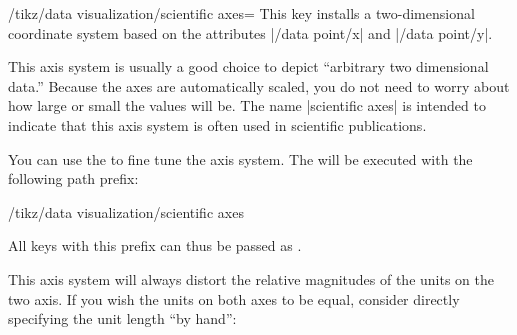 \begin{key}{/tikz/data visualization/scientific axes=}
  This key installs a two-dimensional coordinate system based on the
  attributes |/data point/x| and |/data point/y|.

\begin{codeexample}[width=7cm]
\end{codeexample}

  This axis system is usually a good choice to depict ``arbitrary two
  dimensional data.'' Because the axes are automatically scaled, you
  do not need to worry about how large or small the values will
  be. The name |scientific axes| is intended to indicate that this
  axis system is often used in scientific publications.

  You can use the  to fine tune the axis system. The
   will be executed with the following path prefix:
\begin{codeexample}
/tikz/data visualization/scientific axes    
\end{codeexample}
  All keys with this prefix can thus be passed as .

  This axis system will always distort the
  relative magnitudes of the units on the two axis. If you wish the
  units on both axes to be equal, consider directly specifying the
  unit length ``by hand'':

\begin{codeexample}[]
\end{codeexample}


\end{key}
